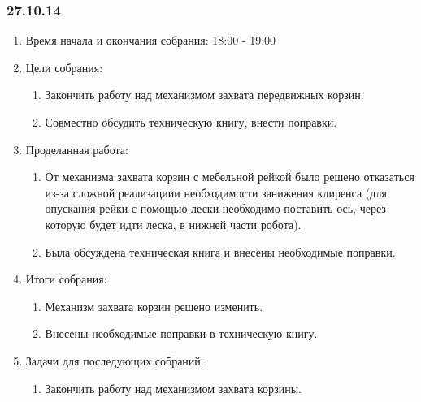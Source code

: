 	
\subsubsection{27.10.14}

\begin{enumerate}
	\item Время начала и окончания собрания:
	18:00 - 19:00
	\item Цели собрания:
	\begin{enumerate}
	  \item Закончить работу над механизмом захвата передвижных корзин.
	  
	  \item Совместно обсудить техническую книгу, внести поправки.
	  
    \end{enumerate}
    
	\item Проделанная работа:
	\begin{enumerate}
	  \item От механизма захвата корзин с мебельной рейкой было решено отказаться из-за сложной реализациии необходимости занижения клиренса (для опускания рейки с помощью лески необходимо поставить ось, через которую будет идти леска, в нижней части робота).
      
      \item Была обсуждена техническая книга и внесены необходимые поправки.
      
    \end{enumerate}
    
	\item Итоги собрания: 
	\begin{enumerate}
	  \item Механизм захвата корзин решено изменить.
	  
	  \item Внесены необходимые поправки в техническую книгу.
      
    \end{enumerate}
    
	\item Задачи для последующих собраний:
	\begin{enumerate}
	  \item Закончить работу над механизмом захвата корзины.
	  
    \end{enumerate}     
\end{enumerate}

\fillpage
